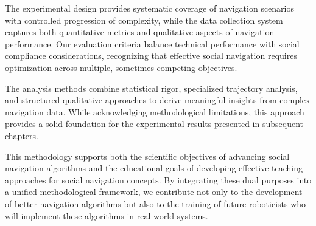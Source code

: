 The experimental design provides systematic coverage of navigation scenarios with 
controlled progression of complexity, while the data collection system captures 
both quantitative metrics and qualitative aspects of navigation performance. Our 
evaluation criteria balance technical performance with social compliance 
considerations, recognizing that effective social navigation requires optimization 
across multiple, sometimes competing objectives.

The analysis methods combine statistical rigor, specialized trajectory analysis, 
and structured qualitative approaches to derive meaningful insights from complex 
navigation data. While acknowledging methodological limitations, this approach 
provides a solid foundation for the experimental results presented in subsequent 
chapters.

This methodology supports both the scientific objectives of advancing social navigation 
algorithms and the educational goals of developing effective teaching approaches for 
social navigation concepts. By integrating these dual purposes into a unified 
methodological framework, we contribute not only to the development of better 
navigation algorithms but also to the training of future roboticists who will 
implement these algorithms in real-world systems.